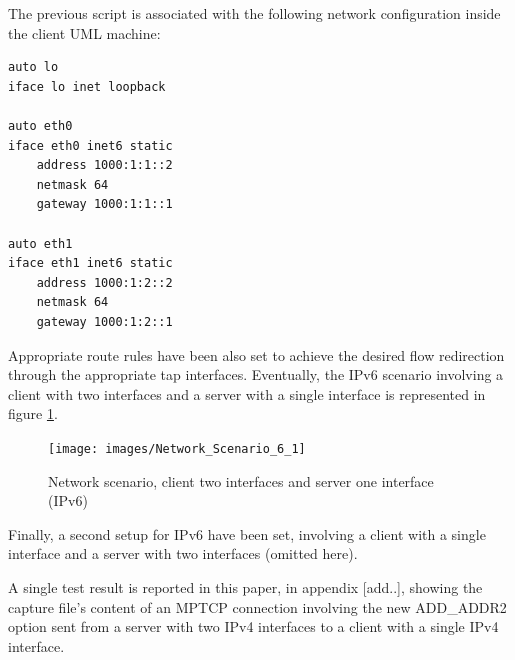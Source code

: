 The previous script is associated with the following network configuration inside the client UML machine:

\begin{verbatim}
auto lo
iface lo inet loopback

auto eth0
iface eth0 inet6 static
	address 1000:1:1::2
	netmask 64
	gateway 1000:1:1::1

auto eth1
iface eth1 inet6 static
	address 1000:1:2::2
	netmask 64
	gateway 1000:1:2::1
\end{verbatim}

Appropriate route rules have been also set to achieve the desired flow redirection through the appropriate tap interfaces. Eventually, the IPv6 scenario involving a client with two interfaces and a server with a single interface is represented in figure \ref{fig:netip6_1}.

\begin{figure}[!htb]
\centering
\texttt{[image: images/Network\_Scenario\_6\_1]}
\caption{Network scenario, client two interfaces and server one interface (IPv6)}
\label{fig:netip6_1}
\end{figure} 

Finally, a second setup for IPv6 have been set, involving a client with a single interface and a server with two interfaces (omitted here).

A single test result is reported in this paper, in appendix [add..], showing the capture file's content of an MPTCP connection involving the new ADD\_ADDR2 option sent from a server with two IPv4 interfaces to a client with a single IPv4 interface.

